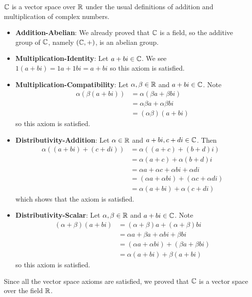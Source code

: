 \begin{example}
    $\mathbb{C}$ is a vector space over $\mathbb{R}$ under the usual definitions of addition and multiplication of complex numbers.
    \begin{itemize}
        \item \textbf{Addition-Abelian}: We already proved that $\mathbb{C}$ is a field, so the additive group of $\mathbb{C}$, namely $(\mathbb{C}, +)$, is an abelian group.

        \item \textbf{Multiplication-Identity}: Let $a + bi \in \mathbb{C}$. We see $1(a+bi) = 1a + 1bi = a + bi$ so this axiom is satisfied.

        \item \textbf{Multiplication-Compatibility}: Let $\alpha, \beta \in \mathbb{R}$ and $a + bi \in \mathbb{C}$. Note
        \begin{align*}
            \alpha(\beta(a+bi)) &= \alpha(\beta a + \beta bi)\\
            &= \alpha\beta a + \alpha\beta bi\\
            &= (\alpha\beta)(a+bi)
        \end{align*}
        so this axiom is satisfied.

        \item \textbf{Distributivity-Addition}: Let $\alpha \in \mathbb{R}$ and $a + bi, c + di \in \mathbb{C}$. Then
        \begin{align*}
            \alpha((a+bi) + (c+di)) &= \alpha((a+c) + (b+d)i)\\
            &= \alpha(a+c) + \alpha(b+d)i\\
            &= \alpha a + \alpha c + \alpha bi + \alpha di\\
            &= (\alpha a + \alpha bi) + (\alpha c + \alpha di)\\
            &= \alpha (a+bi) + \alpha (c+di)
        \end{align*}
        which shows that the axiom is satisfied.

        \item \textbf{Distributivity-Scalar}: Let $\alpha, \beta \in \mathbb{R}$ and $a + bi \in \mathbb{C}$. Note
        \begin{align*}
            (\alpha+\beta)(a+bi) &= (\alpha+\beta)a + (\alpha+\beta)bi\\
            &= \alpha a + \beta a + \alpha bi + \beta bi\\
            &= (\alpha a + \alpha bi) + (\beta a + \beta bi)\\
            &= \alpha(a+bi) + \beta(a+bi)
        \end{align*}
        so this axiom is satisfied.
    \end{itemize}

    Since all the vector space axioms are satisfied, we proved that $\mathbb{C}$ is a vector space over the field $\mathbb{R}$.
\end{example}

